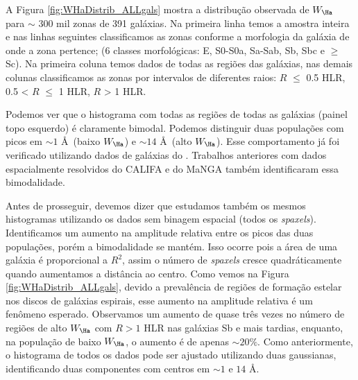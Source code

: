 A Figura \ref{fig:WHaDistrib_ALLgals} mostra a distribução observada de $W_{\Ha}$ para $\sim$ 300 mil zonas de 391 galáxias. Na primeira linha temos a amostra inteira e nas linhas seguintes classificamos as zonas conforme a morfologia da galáxia de onde a zona pertence; (6 classes morfológicas: E, S0-S0a, Sa-Sab, Sb, Sbc e $\ge$ Sc). Na primeira coluna temos dados de todas as regiões das galáxias, nas demais colunas classificamos as zonas por intervalos de diferentes raios: $R$ $\le$ 0.5 HLR, 0.5 < $R$ $\le$ 1 HLR, $R$ > 1 HLR.

Podemos ver que o histograma com todas as regiões de todas as galáxias (painel topo esquerdo) é claramente bimodal. Podemos distinguir duas populações com picos em $\sim 1$ \AA\ (baixo $W_{\Ha}$) e $\sim 14$ \AA\ (alto $W_{\Ha}$).
 Esse comportamento já foi verificado utilizando dados de galáxias do \SDSS \citep{Bamford.etal.2008a, CidFernandes.etal.2011a}. Trabalhos anteriores com dados espacialmente resolvidos do CALIFA \citep{Morisset.etal.2016} e do MaNGA \citep{Belfiore.etal.2016, Belfiore.etal.2017} também identificaram essa bimodalidade.


Antes de prosseguir, devemos dizer que estudamos também os mesmos histogramas utilizando os dados sem binagem espacial (todos os {\em spaxels}). Identificamos um aumento na amplitude relativa entre os picos das duas populações, porém a bimodalidade se mantém. Isso ocorre pois a área de uma galáxia é proporcional a $R^2$, assim o número de {\em spaxels} cresce quadráticamente quando aumentamos a distância ao centro. Como vemos na Figura \ref{fig:WHaDistrib_ALLgals}, devido a prevalência de regiões de formação estelar nos discos de galáxias espirais, esse aumento na amplitude relativa é um fenômeno esperado. Observamos um aumento de quase três vezes no número de regiões de alto $W_{\Ha}$ com $R > 1$ HLR nas galáxias Sb e mais tardias, enquanto, na população de baixo $W_{\Ha}$, o aumento é de apenas $\sim 20\%$. Como anteriormente, o histograma de todos os dados pode ser ajustado utilizando duas gaussianas, identificando duas componentes com centros em $\sim 1$ e $14$ \AA.

